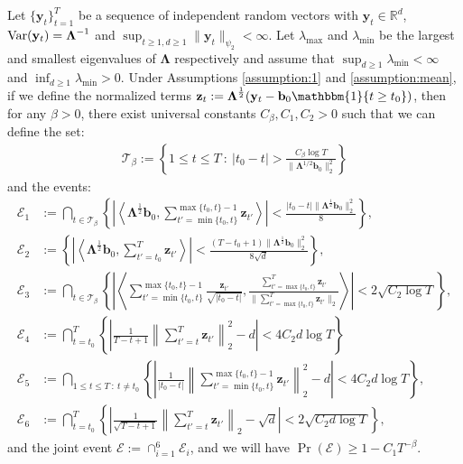 \begin{lemma}\label{lemma:thm1-event-bound}

Let $\{\mathbf{y}_t\}_{t=1}^T$ be a sequence of independent random vectors with $\mathbf{y}_t \in \mathbb{R}^d$, $\normalfont{\text{\normalfont Var}}(\mathbf{y}_t) = \boldsymbol{\Lambda}^{-1}$ and $\sup_{t\geq 1, d\geq 1} \lVert \mathbf{y}_t\rVert_{\psi_2} < \infty$. Let $\lambda_{\max}$ and $\lambda_{\min}$ be the largest and smallest eigenvalues of $\boldsymbol{\Lambda}$ respectively and assume that $\sup_{d\geq 1} \lambda_{\min} < \infty$ and $\inf_{d\geq 1} \lambda_{\min} > 0$. Under Assumptions \ref{assumption:1} and \ref{assumption:mean}, if we define the normalized terms $\mathbf{z}_t := \boldsymbol{\Lambda}^{\frac{1}{2}}(\mathbf{y}_t - \mathbf{b}_0\mathbbm{1}\{t\geq t_0\})$, then for any $\beta > 0$, there exist universal constants $C_\beta, C_1,C_2>0$ such that we can define the set:
\begin{align}
    \mathcal{T}_{\beta} := \left\{1\leq t \leq T\::\:|t_0 - t| > \frac{C_\beta \log T}{\lVert \boldsymbol{\Lambda}^{1/2}\mathbf{b}_0\rVert_2^2}\right\} \label{eq:thm1-index}
\end{align}
and the events:
\begin{align*}
    \mathcal{E}_1 &:= \bigcap_{t \in \mathcal{T}_{\beta} } \left\{ 
    \left|\left\langle\boldsymbol{\Lambda}^{\frac{1}{2}}\mathbf{b}_0, \sum_{t'=\min\{t_0,t\}}^{\max\{t_0,t\}-1}\mathbf{z}_{t'} \right\rangle\right| < \frac{|t_0-t| \lVert\boldsymbol{\Lambda}^{\frac{1}{2}} \mathbf{b}_0\rVert_2^2}{8}\right\}, \\
    \mathcal{E}_2 &:= \left\{\left|\left\langle \boldsymbol{\Lambda}^{\frac{1}{2}}\mathbf{b}_0, \sum_{t'=t_0}^T\mathbf{z}_{t'}\right\rangle\right| < \frac{(T-t_0+1) \lVert\boldsymbol{\Lambda}^{\frac{1}{2}} \mathbf{b}_0\rVert_2^2}{8\sqrt{d}} \right\}, \\
    \mathcal{E}_3 &:=  \bigcap_{t \in \mathcal{T}_{\beta}} \left\{\left|\left\langle \sum_{t'=\min\{t_0,t\}}^{\max\{t_0,t\}-1}\frac{\mathbf{z}_{t'}}{\sqrt{|t_0-t|}}, \frac{\sum_{t'=\max\{t_0,t\}}^{T}\mathbf{z}_{t'}}{\lVert\sum_{t'=\max\{t_0,t\}}^{T}\mathbf{z}_{t'}\rVert_2}\right\rangle\right| < 2\sqrt{C_2\log T}\right\}, \\
    \mathcal{E}_4 &:=\bigcap_{t = t_0}^T \left\{\left|\frac{1}{T-t+1}\left\lVert\sum_{t'=t}^T \mathbf{z}_{t'}\right\rVert_2^2 -d \right| < 4 C_2 d \log T \right\} \\
    \mathcal{E}_5 &:= \bigcap_{1\leq t\leq T\::\:  t \neq t_0} \left\{\left|\frac{1}{|t_0 - t|}\left\lVert\sum_{t'=\min\{t_0,t\}}^{\max\{t_0,t\}-1} \mathbf{z}_{t'}\right\rVert_2^2 -d \right| < 4 C_2 d \log T \right\}, \\
    \mathcal{E}_6 &:= \bigcap_{t = t_0}^T \left\{\left|\frac{1}{\sqrt{T-t+1}}\left\lVert\sum_{t'=t}^T \mathbf{z}_{t'}\right\rVert_2 -\sqrt{d} \right| < 2\sqrt{C_2d \log T} \right\},
\end{align*}
and the joint event $\mathcal{E} := \cap_{i=1}^6 \mathcal{E}_i$, and we will have $\Pr(\mathcal{E}) \geq 1 - C_1T^{-\beta}$.

\end{lemma}

